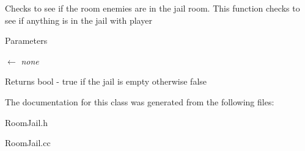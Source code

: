 Checks to see if the room enemies are in the jail room. This function checks to see if anything is in the jail with player 
\begin{DoxyParams}{Parameters}
\item[\mbox{$\leftarrow$} {\em none}]\end{DoxyParams}
\begin{DoxyReturn}{Returns}
bool -\/ true if the jail is empty otherwise false 
\end{DoxyReturn}


The documentation for this class was generated from the following files:\begin{DoxyCompactItemize}
\item 
RoomJail.h\item 
RoomJail.cc\end{DoxyCompactItemize}
